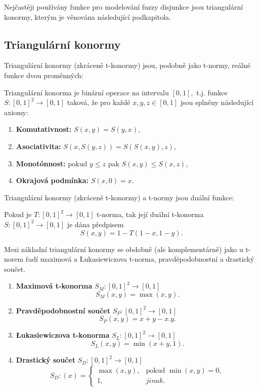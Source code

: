 Nej\v cast\v eji pou\v z\'iv\'any funkce pro modelov\'an\'i fuzzy disjunkce jsou triangul\'arn\'i konormy, kter\'ym je v\v enov\'ana n\'asleduj\'ic\'i podkapitola.

\subsection{Triangul\'arn\'i konormy} 
\label{sec: Triangulární konormy}

Triangulární konormy (zkráceně t-konormy) jsou, podobn\v e jako  t-normy, re\'aln\'e funkce dvou prom\v enn\'ych:
\begin{definition}
    Triangulární konorma je binární operace na intervalu $[0,1],$ t.j. funkce $S: [0,1]^2 \rightarrow [0,1]$ taková, že pro každé $x, y, z \in [0,1]$ jsou splněny následující axiomy:
    \begin{enumerate}
        \item \textbf{Komutativnost: } $S(x,y) = S(y,x),$
        \item \textbf{Asociativita: } $S(x,S(y,z)) = S(S(x,y),z)$,
        \item \textbf{Monotónnost:} pokud $y \leq z$ pak $S(x, y) \leq S(x, z)$,
        \item \textbf{Okrajová podmínka: } $S(x,0) = x.$
    \end{enumerate}
\end{definition}

Triangulární konormy (zkráceně t-konormy) a t-normy jsou du\'aln\'i funkce:

\begin{sentence}
    \cite{Springer}
    Pokud je $T:[0,1]^2\to [0,1]$ t-norma, tak její duální t-konorma $S: [0,1]^2 \rightarrow [0,1]$ je dána předpisem $$S(x,y) = 1 - T(1-x, 1-y).$$
\end{sentence}


Mezi základní triangulární konormy se obdobně (ale komplementárně) jako u t-norem řadí maximová a Łukasiewiczova t-norma, pravděpodobnostní a drastický součet.
\begin{example}
\cite{Springer}
    \begin{enumerate}
    \item \textbf{Maximová t-konorma} $S_M: [0,1]^2 \rightarrow [0,1]$
    $$S_M(x,y) = \max(x,y).$$
    \item \textbf{Pravděpodobnostní součet} $S_P: [0,1]^2 \rightarrow [0,1]$
    $$S_P(x,y) = x+y-x.y.$$
    \item \textbf{Łukasiewiczova t-konorma} $S_L: [0,1]^2 \rightarrow [0,1]$
    $$S_L(x,y) = \min(x+y,1).$$
    \item \textbf{Drastický součet} $S_D: [0,1]^2 \rightarrow [0,1]$
    $$S_D:(x)=\begin{cases} \max(x,y), & \mbox{pokud  }  \min(x,y) = 0,\\ 
    1, &  jinak.  \end{cases}$$
\end{enumerate}
\end{example}



